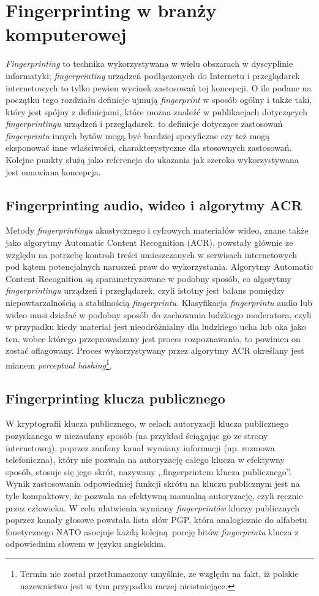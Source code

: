 \section{Fingerprinting w branży komputerowej}
\emph{Fingerprinting} to technika wykorzystywana w wielu obszarach w dyscyplinie
informatyki; \emph{fingerprinting} urządzeń podłączonych do Internetu i
przeglądarek internetowych to tylko pewien wycinek zastosowań tej koncepcji. O
ile podane na początku tego rozdziału definicje ujmują \emph{fingerprint} w
sposób ogólny i także taki, który jest spójny z definicjami, które można znaleźć
w publikacjach dotyczących \emph{fingerprintingu} urządzeń i przeglądarek, to
definicje dotyczące zastosowań \emph{fingerprintu} innych bytów mogą być
bardziej specyficzne czy też mogą eksponować inne właściwości, charakterystyczne
dla stosownych zastosowań. Kolejne punkty służą jako referencja do ukazania jak
szeroko wykorzystywana jest omawiana koncepcja.

\subsection{Fingerprinting audio, wideo i algorytmy ACR}
Metody \emph{fingerprintingu} akustycznego i cyfrowych materiałów wideo, znane
także jako algorytmy Automatic Content Recognition (ACR), powstały głównie ze
względu na potrzebę kontroli treści umieszczanych w serwisach internetowych pod
kątem potencjalnych naruszeń praw do wykorzystania. Algorytmy Automatic Content
Recognition są sparametryzowane w podobny sposób, co algorytmy
\emph{fingerprintingu} urządzeń i przeglądarek, czyli istotny jest balans
pomiędzy niepowtarzalnością a stabilnością \emph{fingerprintu}. Klasyfikacja
\emph{fingerprintu} audio lub wideo musi działać w podobny sposób do zachowania
ludzkiego moderatora, czyli w przypadku kiedy materiał jest nieodróżnialny dla
ludzkiego ucha lub oka jako ten, wobec którego przeprowadzany jest proces
rozpoznawania, to powinien on zostać oflagowany. Proces wykorzystywany przez
algorytmy ACR określany jest mianem \emph{perceptual hashing}\footnote{Termin
	nie został przetłumaczony umyślnie, ze	względu na fakt, iż polskie
nazewnictwo jest w tym przypadku raczej nieistniejące.}.

\subsection{Fingerprinting klucza publicznego}
W kryptografii klucza publicznego, w celach autoryzacji klucza publicznego
pozyskanego w niezaufany sposób (na przykład ściągając go ze strony
internetowej), poprzez zaufany kanał wymiany informacji (np. rozmowa
telefoniczna), który nie pozwala na autoryzację całego klucza w efektywny
sposób, stosuje się jego skrót, nazywany ,,fingerprintem klucza publicznego''.
Wynik zastosowania odpowiedniej funkcji skrótu na kluczu publicznym jest na tyle
kompaktowy, że pozwala na efektywną manualną autoryzację, czyli ręcznie przez
człowieka. W celu ułatwienia wymiany \emph{fingerprintów} kluczy publicznych
poprzez kanały głosowe powstała lista słów PGP, która analogicznie do alfabetu
fonetycznego NATO asocjuje każdą kolejną porcję bitów \emph{fingerprintu} klucza
z odpowiednim słowem w języku angielskim.
